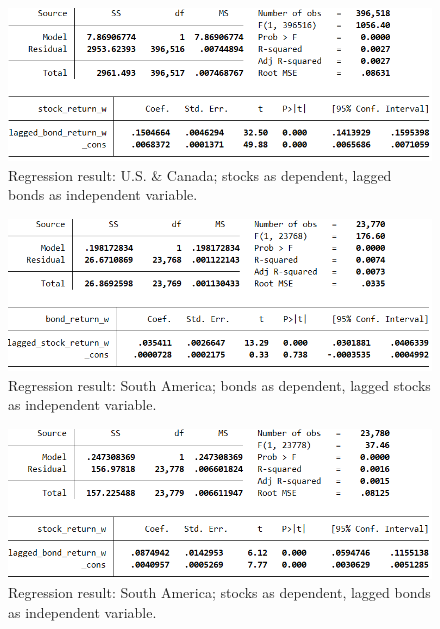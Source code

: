 \begin{figure}[H]
	\centering
	\includegraphics[width=1.0\linewidth]{figures/regression-results/regression-na-stocks-as-dependent.PNG}
	\caption{Regression result: U.S. \& Canada; stocks as dependent, lagged bonds as independent variable. }
	\label{fig:regression-na-stocks-as-dependent}
\end{figure}

\begin{figure}[H]
	\centering
	\includegraphics[width=1.0\linewidth]{figures/regression-results/regression-sa-bonds-as-dependent.PNG}
	\caption{Regression result: South America; bonds as dependent, lagged stocks as independent variable. }
	\label{fig:regression-sa-bonds-as-dependent}
\end{figure}

\begin{figure}[H]
	\centering
	\includegraphics[width=1.0\linewidth]{figures/regression-results/regression-sa-stocks-as-dependent.PNG}
	\caption{Regression result: South America; stocks as dependent, lagged bonds as independent variable. }
	\label{fig:regression-sa-stocks-as-dependent}
\end{figure}

